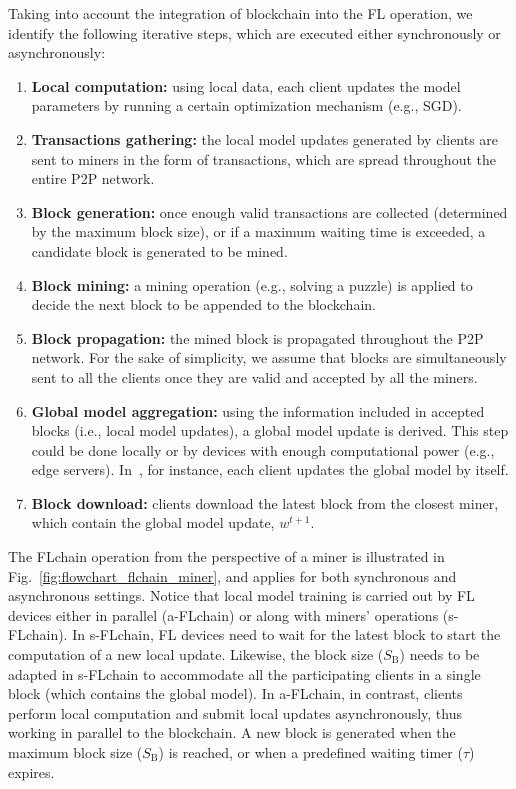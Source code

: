 \documentclass[lettersize,journal]{IEEEtran}
\begin{document}
Taking into account the integration of blockchain into the FL operation, we identify the following iterative steps, which are executed either synchronously or asynchronously:
\begin{enumerate}
	\item \textbf{Local computation:} using local data, each client updates the model parameters by running a certain optimization mechanism (e.g., SGD).
	\item \textbf{Transactions gathering:} the local model updates generated by clients are sent to miners in the form of transactions, which are spread throughout the entire P2P network.
	\item \textbf{Block generation:} once enough valid transactions are collected (determined by the maximum block size), or if a maximum waiting time is exceeded, a candidate block is generated to be mined.
	\item \textbf{Block mining:} a mining operation (e.g., solving a puzzle) is applied to decide the next block to be appended to the blockchain.
	\item \textbf{Block propagation:} the mined block is propagated throughout the P2P network. For the sake of simplicity, we assume that blocks are simultaneously sent to all the clients once they are valid and accepted by all the miners.
	\item \textbf{Global model aggregation:} using the information included in accepted blocks (i.e., local model updates), a global model update is derived. This step could be done locally or by devices with enough computational power (e.g., edge servers). In~\cite{kim2019blockchained,ma2020federated}, for instance, each client updates the global model by itself.
	\item \textbf{Block download:} clients download the latest block from the closest miner, which contain the global model update, $w^{t+1}$.
\end{enumerate}

The FLchain operation from the perspective of a miner is illustrated in Fig.~\ref{fig:flowchart_flchain_miner}, and applies for both synchronous and asynchronous settings. Notice that local model training is carried out by FL devices either in parallel (a-FLchain) or along with miners' operations (s-FLchain). In s-FLchain, FL devices need to wait for the latest block to start the computation of a new local update. Likewise, the block size ($S_\text{B}$) needs to be adapted in s-FLchain to accommodate all the participating clients in a single block (which contains the global model). In a-FLchain, in contrast, clients perform local computation and submit local updates asynchronously, thus working in parallel to the blockchain. A new block is generated when the maximum block size ($S_\text{B}$) is reached, or when a predefined waiting timer ($\tau$) expires.
\end{document}
